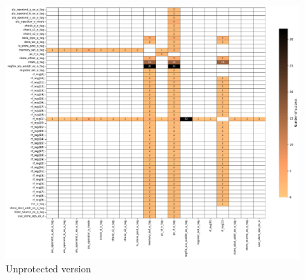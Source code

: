\begin{frame}{}
    \begin{minipage}[c]{0.5\linewidth}
        \begin{figure}
            \centering
            \includegraphics[width=\textwidth]{src/5_results/img/heatmap_buffer_overflow_wop_1_multi_bitflip_reg_multi_2.pdf}
            \caption{Unprotected version}
            \label{fig:heatmap_multibit_1}
        \end{figure}
    \end{minipage}\hfill%
    \begin{minipage}[c]{0.5\linewidth}
\end{minipage}
\end{frame}

